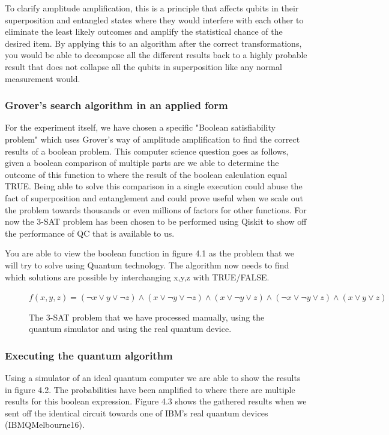 To clarify amplitude amplification, this is a principle that affects qubits in their superposition and entangled states where they would interfere with each other to eliminate the least likely outcomes and amplify the statistical chance of the desired item. By applying this to an algorithm after the correct transformations, you would be able to decompose all the different results back to a highly probable result that does not collapse all the qubits in superposition like any normal measurement would. 

\subsubsection{Grover's search algorithm in an applied form}

For the experiment itself, we have chosen a specific "Boolean satisfiability problem" which uses Grover's way of amplitude amplification to find the correct results of a boolean problem. This computer science question goes as follows, given a boolean comparison of multiple parts are we able to determine the outcome of this function to where the result of the boolean calculation equal TRUE. Being able to solve this comparison in a single execution could abuse the fact of superposition and entanglement and could prove useful when we scale out the problem towards thousands or even millions of factors for other functions. For now the 3-SAT problem has been chosen to be performed using Qiskit to show off the performance of QC that is available to us.

You are able to view the boolean function in figure 4.1 as the problem that we will try to solve using Quantum technology. The algorithm now needs to find which solutions are possible by interchanging x,y,z with TRUE/FALSE.

\begin{figure}
	$ f(x,y,z) = (\neg x \vee y \vee \neg z) \wedge  ( x \vee \neg y \vee \neg z) \wedge ( x \vee \neg y \vee  z) \wedge (\neg x \vee \neg y \vee z) \wedge  ( x \vee y \vee  z)	 $
	\caption{The 3-SAT problem that we have processed manually, using the quantum simulator and using the real quantum device.}
\end{figure}

				 
\subsubsection{Executing the quantum algorithm}				 

Using a simulator of an ideal quantum computer we are able to show the results in figure 4.2. The probabilities have been amplified to where there are multiple results for this boolean expression. Figure 4.3 shows the gathered results when we sent off the identical circuit towards one of IBM's real quantum devices (IBMQMelbourne16). 

